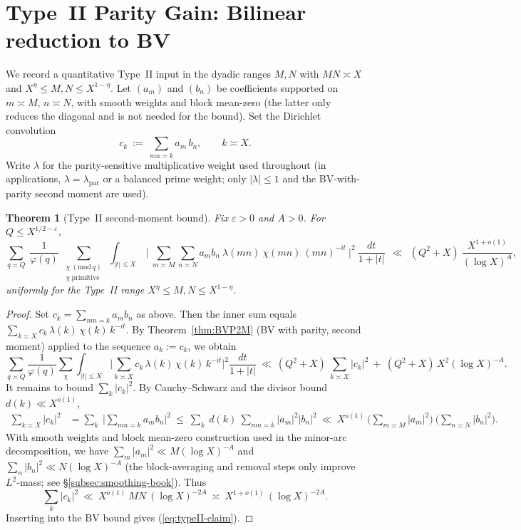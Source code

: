 \documentclass[11pt]{article}
\def\eqref#1{(\ref{#1})}%
\newtheorem{theorem}[lemma]{Theorem}
\theoremstyle{definition}
\theoremstyle{remark}
\numberwithin{equation}{part}
\begin{document}
\section{Type~II Parity Gain: Bilinear reduction to BV}\label{sec:typeII}

We record a quantitative Type~II input in the dyadic ranges $M,N$ with $MN\asymp X$ and $X^\eta\le M,N\le X^{1-\eta}$.
Let $(a_m)$ and $(b_n)$ be coefficients supported on $m\asymp M$, $n\asymp N$, with smooth weights and block mean-zero (the latter only reduces the diagonal and is not needed for the bound). Set the Dirichlet convolution
\[
	c_k\ :=\ \sum_{mn=k} a_m\,b_n,\qquad k\asymp X.
\]
Write $\lambda$ for the parity-sensitive multiplicative weight used throughout (in applications, $\lambda=\lambda_{\mathrm{par}}$ or a balanced prime weight; only $|\lambda|\le 1$ and the BV-with-parity second moment are used).

\begin{theorem}[Type~II second-moment bound]\label{thm:typeII}
	Fix $\varepsilon>0$ and $A>0$. For $Q\le X^{1/2-\varepsilon}$,
	\begin{equation}\label{eq:typeII-claim}
		\sum_{q\asymp Q}\ \frac{1}{\varphi(q)}\ \sum_{\substack{\chi\ (\mathrm{mod}\ q)\\ \chi\ \mathrm{primitive}}}\
		\int_{|t|\le X}\ \Bigg|\ \sum_{m\asymp M}\sum_{n\asymp N} a_m b_n\ \lambda(mn)\ \chi(mn)\ (mn)^{-it}\ \Bigg|^2\ \frac{dt}{1+|t|}
		\ \ \ll\ \ (Q^2+X)\ \frac{X^{1+o(1)}}{(\log X)^A},
	\end{equation}
	uniformly for the Type~II range $X^\eta\le M,N\le X^{1-\eta}$.
\end{theorem}

\begin{proof}
	Set $c_k=\sum_{mn=k} a_m b_n$ as above.
	Then the inner sum equals $\sum_{k\asymp X} c_k\,\lambda(k)\,\chi(k)\,k^{-it}$.
	By Theorem~\ref{thm:BVP2M} (BV with parity, second moment) applied to the sequence $a_k:=c_k$, we obtain
	\[
		\sum_{q\asymp Q}\frac{1}{\varphi(q)}\sum_{\chi}\int_{|t|\le X}\Big|\sum_{k\asymp X} c_k\,\lambda(k)\,\chi(k)\,k^{-it}\Big|^2\frac{dt}{1+|t|}
		\ \ll\ (Q^2+X)\ \sum_{k\asymp X}|c_k|^2\ +\ (Q^2+X)\,X^2(\log X)^{-A}.
	\]
	It remains to bound $\sum_k |c_k|^2$.
	By Cauchy--Schwarz and the divisor bound $d(k)\ll X^{o(1)}$,
	\begin{align*}
		\sum_{k\asymp X} |c_k|^2
		 & = \sum_{k}\ \Big|\sum_{mn=k} a_m b_n\Big|^2
		\ \le\ \sum_{k}\ d(k)\ \sum_{mn=k} |a_m|^2|b_n|^2
		\ \ll\ X^{o(1)}\ \Big(\sum_{m\asymp M}|a_m|^2\Big)\ \Big(\sum_{n\asymp N}|b_n|^2\Big).
	\end{align*}
	With smooth weights and block mean-zero construction used in the minor-arc decomposition, we have
	$\sum_{m}|a_m|^2\ll M(\log X)^{-A}$ and $\sum_{n}|b_n|^2\ll N(\log X)^{-A}$ (the block-averaging and removal steps only improve $L^2$-mass; see \S\ref{subsec:smoothing-book}).
	Thus
	\[
		\sum_{k}|c_k|^2\ \ll\ X^{o(1)}\ MN\ (\log X)^{-2A}\ \asymp\ X^{1+o(1)}\,(\log X)^{-2A}.
	\]
	Inserting into the BV bound gives \eqref{eq:typeII-claim}.
\end{proof}
\end{document}
